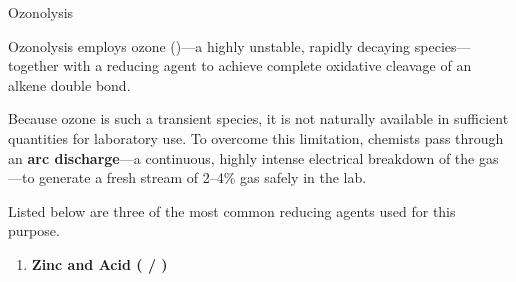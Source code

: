 \documentclass[10pt]{article}
\begin{document}
      \begin{core}[label=core:ozonolysis]{Ozonolysis}

        Ozonolysis employs ozone ()---a highly unstable, rapidly decaying species---together with a reducing agent to achieve complete oxidative cleavage of an alkene double bond.


        Because ozone is such a transient species, it is not naturally available in sufficient quantities for laboratory use. To overcome this limitation, chemists pass  through an \textbf{arc discharge}---a continuous, highly intense electrical breakdown of the gas---to generate a fresh stream of 2--4\%  gas safely in the lab.


        Listed below are three of the most common reducing agents used for this purpose.

        \begin{enumerate}

          \item \textbf{Zinc and Acid ( / )} 



\end{enumerate}
\end{core}
\end{document}

